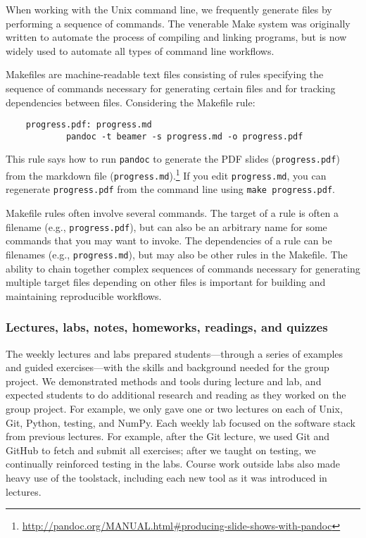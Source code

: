 When working with the Unix command line, we frequently generate files
by performing a sequence of commands.
The venerable Make system was originally written to automate the process
of compiling and linking programs, but is now widely used to
automate all types of command line workflows.

Makefiles are machine-readable text files consisting of rules
specifying the sequence of commands necessary for generating
certain files and for tracking dependencies between files.
Considering the Makefile rule:
\begin{verbatim}
    progress.pdf: progress.md
            pandoc -t beamer -s progress.md -o progress.pdf
\end{verbatim}
This rule says how to run \texttt{pandoc} to generate the PDF slides (\texttt{progress.pdf}) from the
markdown file (\texttt{progress.md}).\footnote{\url{http://pandoc.org/MANUAL.html\#producing-slide-shows-with-pandoc}}
If you edit \texttt{progress.md}, you can regenerate \texttt{progress.pdf}
from the command line using \texttt{make progress.pdf}.

Makefile rules often involve several commands.
The target of a rule is often a filename (e.g., \texttt{progress.pdf}), but can
also be an arbitrary name for some commands that you may want to invoke.
The dependencies of a rule can be filenames (e.g., \texttt{progress.md}), but
may also be other rules in the Makefile.
The ability to chain together complex sequences of commands necessary for
generating multiple target files depending on other files is important for
building and maintaining reproducible workflows.

\subsubsection{Lectures, labs, notes, homeworks, readings, and quizzes}

The weekly lectures and labs prepared students---through a
series of examples and guided exercises---with the skills and
background needed for the group project.
We demonstrated methods and tools during lecture and lab,
and expected students to do additional research and reading as they worked on
the group project.
For example, we only gave one or two lectures on each of Unix, Git, Python,
testing, and NumPy.
Each weekly lab focused on the software stack from previous lectures.
For example, after the Git lecture, we used Git and GitHub to fetch and submit
all exercises;
after we taught on testing, we continually reinforced testing in the labs.
Course work outside labs also made heavy use of the toolstack, including each
new tool as it was introduced in lectures.

